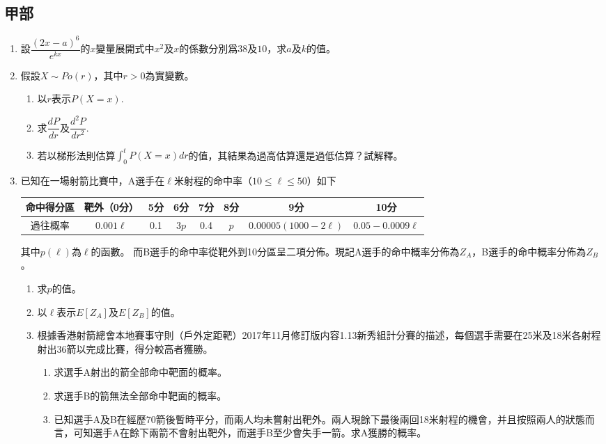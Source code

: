 \documentclass[12pt]{article}
\begin{document}
    \subsection*{甲部}
    \begin{enumerate}
        \item 設$\dfrac{(2x-a)^6}{e^{kx}}$的$x$變量展開式中$x^2$及$x$的係數分別爲$38$及$10$，求$a$及$k$的值。
        \item 假設$X\sim Po(r)$，其中$r>0$為實變數。\begin{enumerate}
            \item 以$r$表示$P(X=x)$.
            \item 求$\dfrac{dP}{dr}$及$\dfrac{d^2P}{dr^2}$.
            \item 若以梯形法則估算$\int_{0}^{t}P(X=x) dr$的值，其結果為過高估算還是過低估算？試解釋。
        \end{enumerate}
        \item 已知在一場射箭比賽中，A選手在$\ell$米射程的命中率（$10\leq \ell \leq 50$）如下\begin{center}
            \begin{tabular}{|c||c|c|c|c|c|c|c|}
                \hline
                命中得分區&靶外（0分）&5分&6分&7分&8分&9分&10分\\
                \hline
                過往概率&$0.001\ell$&0.1&$3p$&0.4&$p$&$0.00005(1000-2\ell)$&$0.05-0.0009\ell$\\
                \hline
            \end{tabular}
        \end{center}
        其中$p(\ell)$為$\ell$的函數。
        而B選手的命中率從靶外到10分區呈二項分佈。現記A選手的命中概率分佈為$Z_A$，B選手的命中概率分佈為$Z_B$。\begin{enumerate}
            \item 求$p$的值。
            \item 以$\ell$表示$E[Z_A]$及$E[Z_B]$的值。
            \item 根據香港射箭總會本地賽事守則（戶外定距靶）2017年11月修訂版内容1.13新秀組計分賽的描述，每個選手需要在25米及18米各射程射出36箭以完成比賽，得分較高者獲勝。\begin{enumerate}
                \item 求選手A射出的箭全部命中靶面的概率。
                \item 求選手B的箭無法全部命中靶面的概率。
                \item 已知選手A及B在經歷70箭後暫時平分，而兩人均未嘗射出靶外。兩人現餘下最後兩回18米射程的機會，并且按照兩人的狀態而言，可知選手A在餘下兩箭不會射出靶外，而選手B至少會失手一箭。求A獲勝的概率。

\end{enumerate}
\end{enumerate}
\end{enumerate}
\end{document}
